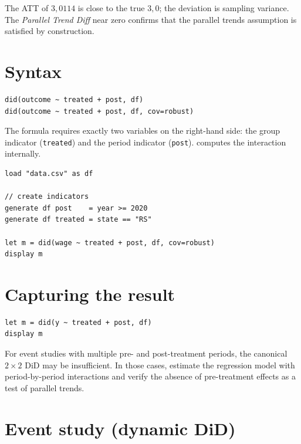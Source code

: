 The ATT of $3{,}0114$ is close to the true $3{,}0$; the deviation is sampling
variance. The \emph{Parallel Trend Diff} near zero confirms that the
parallel trends assumption is satisfied by construction.

\section{Syntax}

\begin{lstlisting}
did(outcome ~ treated + post, df)
did(outcome ~ treated + post, df, cov=robust)
\end{lstlisting}

The formula requires exactly two variables on the right-hand side: the group
indicator (\lstinline{treated}) and the period indicator (\lstinline{post}).
\hayashi{} computes the interaction internally.

\begin{lstlisting}[caption={Typical DiD workflow}]
load "data.csv" as df

// create indicators
generate df post    = year >= 2020
generate df treated = state == "RS"

let m = did(wage ~ treated + post, df, cov=robust)
display m
\end{lstlisting}

\section{Capturing the result}

\begin{lstlisting}
let m = did(y ~ treated + post, df)
display m
\end{lstlisting}

\begin{nota}
  For event studies with multiple pre- and post-treatment periods,
  the canonical $2\times 2$ DiD may be insufficient. In those cases,
  estimate the regression model with period-by-period interactions and
  verify the absence of pre-treatment effects as a test of
  parallel trends.
\end{nota}

\section{Event study (dynamic DiD)}


